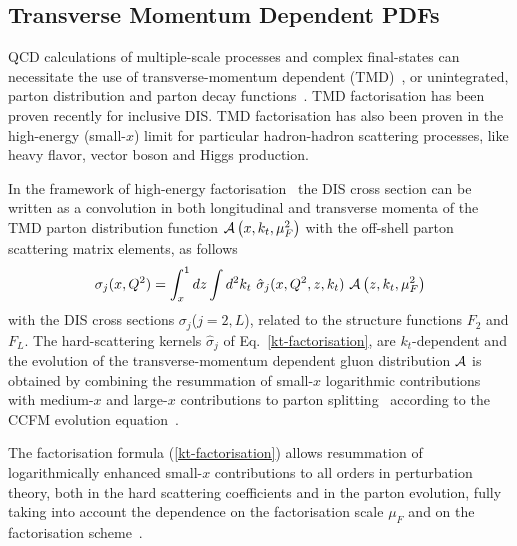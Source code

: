 \subsection{Transverse Momentum Dependent PDFs}


\def\kt{\ensuremath{k_t}}
\def\pt{\ensuremath{p_t}}


QCD calculations of multiple-scale processes  and complex final-states
can necessitate the use of transverse-momentum dependent (TMD)~\cite{Collins:2011zzd}, or 
unintegrated, parton distribution and parton decay 
functions~\cite{Aybat:2011zv,Buffing:2013eka,Buffing:2013kca,Buffing:2012sz,Mulders:2008tf,Jadach:2009gm,Hautmann:2009zzb,Hautmann:2012pf,Hautmann:2007gw}.   
TMD factorisation has been proven recently \cite{Collins:2011zzd} for inclusive DIS. TMD factorisation has also been proven in the high-energy (small-$x$) limit \cite{Catani:1990xk,Collins:1991ty,Hautmann:2002tu} for 
particular hadron-hadron scattering processes, like heavy flavor, vector boson and Higgs production.
  
In the framework of high-energy factorisation~\cite{Catani:1990xk,Catani:1990eg,Catani:1993ww} 
the DIS cross section can be written as a convolution in 
both longitudinal and transverse momenta of the TMD parton distribution function 
${\cal A}\left(x,\kt,\mu_{F}^2\right)$    
 with the off-shell parton scattering matrix elements, as follows 
\begin{equation}
 \sigma_j (x, Q^2) = \int_x^1  
d z \int d^2k_t \ 
\hat{\sigma}_j(x,Q^2,{z},k_t) \ 
 {\cal  A}\left( {z} ,\kt, \mu_{F}^2 \right) 
\label{kt-factorisation}
\end{equation}
with the DIS cross sections 
$\sigma_j$($j= 2 , L$),  related to the  structure functions $F_2$ and $F_L$.
The hard-scattering kernels ${\hat \sigma}_j$ of Eq.~\ref{kt-factorisation},    are $k_t$-dependent and the evolution  of the 
transverse-momentum dependent gluon distribution 
${\cal A} $ is obtained by combining the resummation of small-$x$ logarithmic 
contributions \cite{Lipatov:1996ts,Fadin:1975cb,Balitsky:1978ic} with medium-$x$ and large-$x$ 
contributions to parton  splitting~\cite{Gribov:1972ri,Altarelli:1977zs,Dokshitzer:1977sg} according to the 
CCFM evolution equation~\cite{Ciafaloni:1987ur,Catani:1989sg,Marchesini:1994wr}.
  
The factorisation formula (\ref{kt-factorisation})  
allows resummation of logarithmically enhanced small-$x$ contributions  
to all orders in perturbation theory,  
both in the  hard scattering coefficients and 
in the parton evolution, fully taking into account the 
dependence on the factorisation scale $\mu_{F}$ and on the 
factorisation scheme~\cite{Catani:1994sq,Catani:1993rn}.  
 
